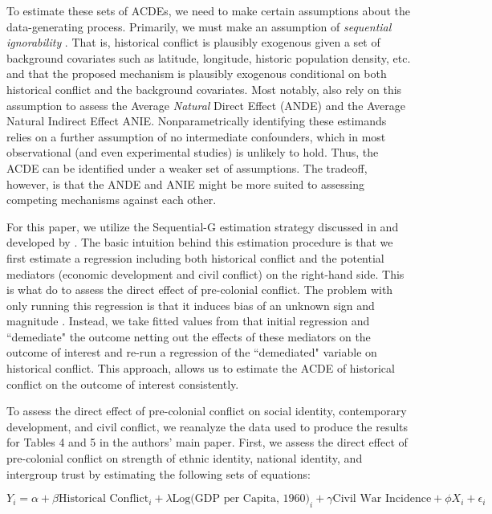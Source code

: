 To estimate these sets of ACDEs, we need to make certain assumptions about the data-generating process. Primarily, we must make an assumption of \emph{sequential ignorability} \citet{Robins1997,AcharyaBlackwellSen2016}. That is, historical conflict is plausibly exogenous given a set of background covariates such as latitude, longitude, historic population density, etc. and that the proposed mechanism is plausibly exogenous conditional on both historical conflict and the background covariates. Most notably, \citet{ImaiEtAl2011} also rely on this assumption to assess the Average \emph{Natural} Direct Effect (ANDE) and the Average Natural Indirect Effect {ANIE}. Nonparametrically identifying these estimands relies on a further assumption of no intermediate confounders, which in most observational (and even experimental studies) is unlikely to hold. Thus, the ACDE can be identified under a weaker set of assumptions. The tradeoff, however, is that the ANDE and ANIE might be more suited to assessing competing mechanisms against each other. 

For this paper, we utilize the Sequential-G estimation strategy discussed in \citet{AcharyaBlackwellSen2016} and developed by \citet{JoffeGreene2009,Vansteelandt2009}. The basic intuition behind this estimation procedure is that we first estimate a regression including both historical conflict and the potential mediators (economic development and civil conflict) on the right-hand side. This is what \citet{BesleyRQ2014} do to assess the direct effect of pre-colonial conflict. The problem with only running this regression is that it induces bias of an unknown sign and magnitude \citep{AcharyaBlackwellSen2016}. Instead, we take fitted values from that initial regression and ``demediate" the outcome netting out the effects of these mediators on the outcome of interest and re-run a regression of the ``demediated" variable on historical conflict. This approach, allows us to estimate the ACDE of historical conflict on the outcome of interest consistently. 

To assess the direct effect of pre-colonial conflict on social identity, contemporary development, and civil conflict, we reanalyze the data used to produce the results for Tables 4 and 5 in the authors' main paper. First, we assess the direct effect of pre-colonial conflict on strength of ethnic identity, national identity, and intergroup trust by estimating the following sets of equations:

\begin{equation}
Y_i = \alpha + \beta \text{Historical Conflict}_i + \lambda \text{Log(GDP per Capita, 1960)}_i + \gamma \text{Civil War Incidence} + \phi X_i + \epsilon_i
\end{equation}

